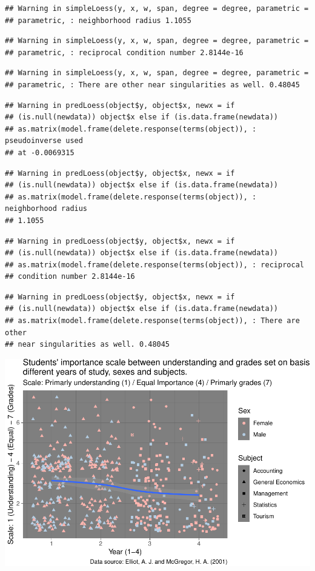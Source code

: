 \documentclass[]{article}
\begin{document}
\begin{verbatim}
## Warning in simpleLoess(y, x, w, span, degree = degree, parametric =
## parametric, : neighborhood radius 1.1055
\end{verbatim}

\begin{verbatim}
## Warning in simpleLoess(y, x, w, span, degree = degree, parametric =
## parametric, : reciprocal condition number 2.8144e-16
\end{verbatim}

\begin{verbatim}
## Warning in simpleLoess(y, x, w, span, degree = degree, parametric =
## parametric, : There are other near singularities as well. 0.48045
\end{verbatim}

\begin{verbatim}
## Warning in predLoess(object$y, object$x, newx = if
## (is.null(newdata)) object$x else if (is.data.frame(newdata))
## as.matrix(model.frame(delete.response(terms(object)), : pseudoinverse used
## at -0.0069315
\end{verbatim}

\begin{verbatim}
## Warning in predLoess(object$y, object$x, newx = if
## (is.null(newdata)) object$x else if (is.data.frame(newdata))
## as.matrix(model.frame(delete.response(terms(object)), : neighborhood radius
## 1.1055
\end{verbatim}

\begin{verbatim}
## Warning in predLoess(object$y, object$x, newx = if
## (is.null(newdata)) object$x else if (is.data.frame(newdata))
## as.matrix(model.frame(delete.response(terms(object)), : reciprocal
## condition number 2.8144e-16
\end{verbatim}

\begin{verbatim}
## Warning in predLoess(object$y, object$x, newx = if
## (is.null(newdata)) object$x else if (is.data.frame(newdata))
## as.matrix(model.frame(delete.response(terms(object)), : There are other
## near singularities as well. 0.48045
\end{verbatim}

\includegraphics{StudentGoals_files/figure-latex/unnamed-chunk-19-1.pdf}
\end{document}
